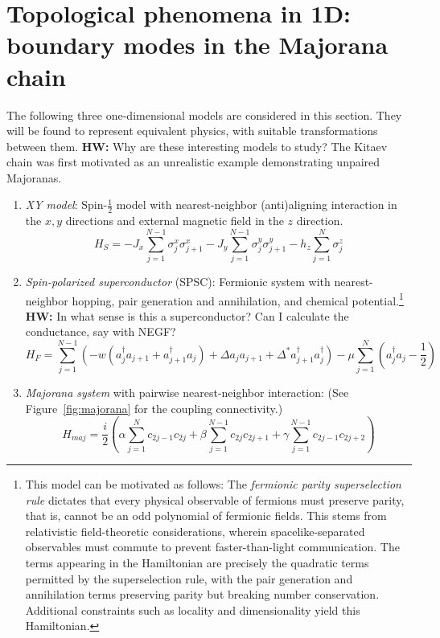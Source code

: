 \documentclass{article}
\newcommand{\hwnote}[1]{{\color{red}\textbf{HW:} #1}}
\begin{document}
\section{Topological phenomena in 1D: boundary modes in the Majorana chain}
The following three one-dimensional models are considered in this section.
They will be found to represent equivalent physics, with suitable transformations between them.
\hwnote{Why are these interesting models to study?
The Kitaev chain was first motivated as an unrealistic example demonstrating unpaired Majoranas.~\cite{kitaev2001}
}
\begin{enumerate}
    \item \emph{XY model}:
        Spin-$\frac{1}{2}$ model with nearest-neighbor (anti)aligning interaction in the $x, y$ directions
        and external magnetic field in the $z$ direction.
        \[
            H_S = -J_x\sum_{j=1}^{N-1} \sigma_j^x \sigma_{j+1}^x
                  -J_y\sum_{j=1}^{N-1} \sigma_j^y \sigma_{j+1}^y
                  - h_z \sum_{j=1}^N \sigma_j^z
        \]

    \item \emph{Spin-polarized superconductor} (SPSC):
        Fermionic system with nearest-neighbor hopping, pair generation and annihilation, and chemical potential.\footnote{\label{foot:parity-super}%
        This model can be motivated as follows:
        The \emph{fermionic parity superselection rule} dictates that every physical observable of fermions must preserve parity,
        that is, cannot be an odd polynomial of fermionic fields.
        This stems from relativistic field-theoretic considerations,
        wherein spacelike-separated observables must commute to prevent faster-than-light communication.
        The terms appearing in the Hamiltonian are precisely
        the quadratic terms permitted by the superselection rule,
        with the pair generation and annihilation terms preserving parity but breaking number conservation.
        Additional constraints such as locality and dimensionality yield this Hamiltonian.
        }
        \hwnote{In what sense is this a superconductor? Can I calculate the conductance, say with NEGF?}
        \[
            H_F = \sum_{j=1}^{N-1} \left(
                -w\left(a_j^\dagger a_{j+1} + a_{j+1}^\dagger a_j \right)
                +\Delta a_j a_{j+1} + \Delta^* a_{j+1}^\dagger a_j^\dagger
            \right)
            -\mu \sum_{j=1}^N \left( a_j^\dagger a_j - \frac{1}{2} \right)
        \]

    \item \emph{Majorana system} with pairwise nearest-neighbor interaction:
        (See Figure~\ref{fig:majorana} for the coupling connectivity.)
        \[
            H_{maj} = \frac{i}{2} \left(
                \alpha \sum_{j=1}^N c_{2j-1}c_{2j}
                + \beta \sum_{j=1}^{N-1} c_{2j}c_{2j+1}
                + \gamma \sum_{j=1}^{N-1} c_{2j-1}c_{2j+2}
            \right)
        \]
\end{enumerate}
\end{document}
